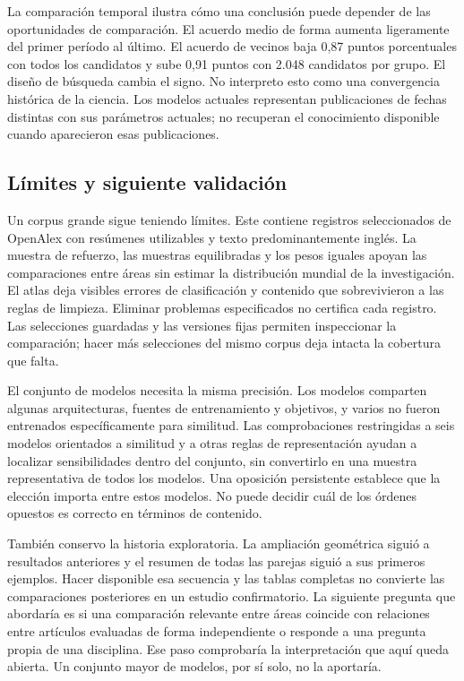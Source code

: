 \documentclass[12pt]{article}
\begin{document}
La comparación temporal ilustra cómo una conclusión puede depender de las oportunidades de comparación. El acuerdo medio de forma aumenta ligeramente del primer período al último. El acuerdo de vecinos baja 0,87 puntos porcentuales con todos los candidatos y sube 0,91 puntos con 2.048 candidatos por grupo. El diseño de búsqueda cambia el signo. No interpreto esto como una convergencia histórica de la ciencia. Los modelos actuales representan publicaciones de fechas distintas con sus parámetros actuales; no recuperan el conocimiento disponible cuando aparecieron esas publicaciones.

\subsection{Límites y siguiente validación}
Un corpus grande sigue teniendo límites. Este contiene registros seleccionados de OpenAlex con resúmenes utilizables y texto predominantemente inglés. La muestra de refuerzo, las muestras equilibradas y los pesos iguales apoyan las comparaciones entre áreas sin estimar la distribución mundial de la investigación. El atlas deja visibles errores de clasificación y contenido que sobrevivieron a las reglas de limpieza. Eliminar problemas especificados no certifica cada registro. Las selecciones guardadas y las versiones fijas permiten inspeccionar la comparación; hacer más selecciones del mismo corpus deja intacta la cobertura que falta.

El conjunto de modelos necesita la misma precisión. Los modelos comparten algunas arquitecturas, fuentes de entrenamiento y objetivos, y varios no fueron entrenados específicamente para similitud. Las comprobaciones restringidas a seis modelos orientados a similitud y a otras reglas de representación ayudan a localizar sensibilidades dentro del conjunto, sin convertirlo en una muestra representativa de todos los modelos. Una oposición persistente establece que la elección importa entre estos modelos. No puede decidir cuál de los órdenes opuestos es correcto en términos de contenido.

También conservo la historia exploratoria. La ampliación geométrica siguió a resultados anteriores y el resumen de todas las parejas siguió a sus primeros ejemplos. Hacer disponible esa secuencia y las tablas completas no convierte las comparaciones posteriores en un estudio confirmatorio. La siguiente pregunta que abordaría es si una comparación relevante entre áreas coincide con relaciones entre artículos evaluadas de forma independiente o responde a una pregunta propia de una disciplina. Ese paso comprobaría la interpretación que aquí queda abierta. Un conjunto mayor de modelos, por sí solo, no la aportaría.
\end{document}
